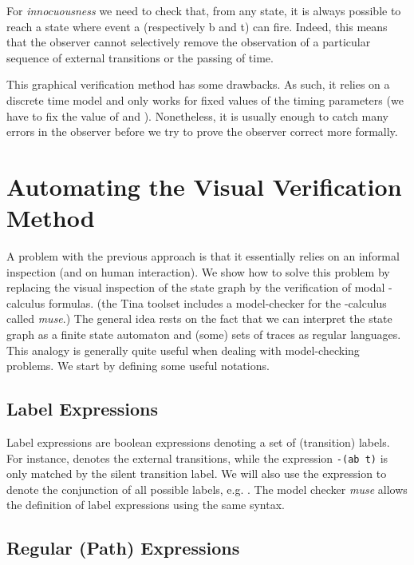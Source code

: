\documentclass[a4paper]{scrartcl}
\def\vars#1{\textsf{\small #1}}
\newcommand{\ltl}[1]{\texttt{#1}}
\begin{document}
For \emph{innocuousness} we need to check that, from any state, it is
always possible to reach a state where event \vars{a} (respectively
\vars{b} and \vars{t}) can fire. Indeed, this means that the observer
cannot selectively remove the observation of a particular sequence of
external transitions or the passing of time. 

This graphical verification method has some drawbacks. As such, it
relies on a discrete time model and only works for fixed values of the
timing parameters (we have to fix the value of  and
). Nonetheless, it is usually enough to catch many errors in the
observer before we try to prove the observer correct more formally.

\section{Automating  the Visual Verification Method}
\label{sec:autom-visu-verif}

A problem with the previous approach is that it essentially relies on
an informal inspection (and on human interaction). We show how to
solve this problem by replacing the visual inspection of the state
graph by the verification of modal -calculus formulas. (the Tina
toolset includes a model-checker for the -calculus called
\emph{muse}.)  The general idea rests on the fact that we can
interpret the state graph as a finite state automaton and (some) sets
of traces as regular languages. This analogy is generally quite useful
when dealing with model-checking problems.  We start by defining some
useful notations.

\subsection{Label Expressions} 

Label expressions are boolean expressions denoting a set of
(transition) labels. For instance,
 denotes the external
transitions, while the expression \ltl{-(\vars{a}\ltlor \vars{b}\ltlor
  \vars{t})} is only matched by the silent transition label. We will
also use the expression  to denote the conjunction of all
possible labels, e.g.
. The model checker
\emph{muse} allows the definition of label expressions using the same
syntax.

\subsection{Regular (Path) Expressions} 
\end{document}
